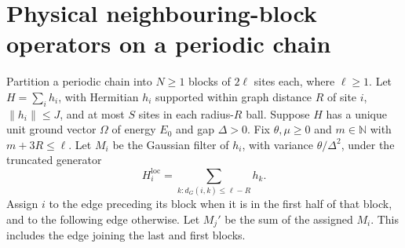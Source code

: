 \section{Physical neighbouring-block operators on a periodic chain}
\label{sec:hastings05_physical_periodic_pairs}

\begin{lemma}
    \label{thm:hastings05_physical_periodic_pairs}
    \leanok
    Partition a periodic chain into $N\ge1$ blocks of $2\ell$ sites each,
    where $\ell\ge1$. Let $H=\sum_i h_i$, with Hermitian $h_i$ supported
    within graph distance $R$ of site $i$, $\|h_i\|\le J$, and at most $S$
    sites in each radius-$R$ ball. Suppose $H$ has a unique unit ground
    vector $\Omega$ of energy $E_0$ and gap $\Delta>0$.
    Fix $\theta,\mu\ge0$ and $m\in\mathbb N$ with $m+3R\le\ell$.
    Let $M_i$ be the Gaussian filter of $h_i$, with variance
    $\theta/\Delta^2$, under the truncated generator
    \[
        H_i^{\mathrm{loc}}=\sum_{k:d_G(i,k)\le\ell-R}h_k.
    \]
    Assign $i$ to the edge preceding its block when it is in the first
    half of that block, and to the following edge otherwise. Let $M_j'$
    be the sum of the assigned $M_i$. This includes the edge joining the
    last and first blocks.


\end{lemma}
